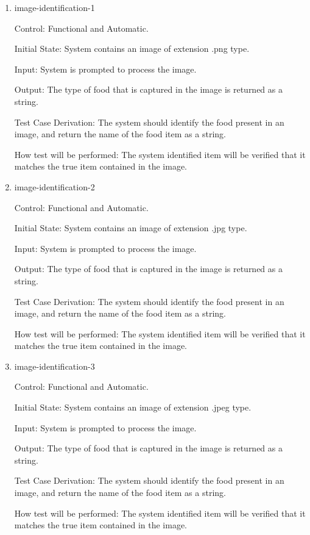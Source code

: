 \documentclass[12pt, titlepage]{article}
\begin{document}
	\begin{enumerate}
		
		\item{image-identification-1\\}
		
		Control: Functional and Automatic.
		
		Initial State: System contains an image of extension .png type.
		
		Input: System is prompted to process the image.
		
		Output: The type of food that is captured in the image is returned as a 
		string.
		
		Test Case Derivation: The system should identify the food present in an 
		image, and return the name of the food item as a string.
		
		How test will be performed: The system identified item will be verified 
		that it matches the true item contained in the image.
		
		\item{image-identification-2\\}
		
		Control: Functional and Automatic.
		
		Initial State: System contains an image of extension .jpg type.
		
		Input: System is prompted to process the image.
		
		Output: The type of food that is captured in the image is returned as a 
		string.
		
		Test Case Derivation: The system should identify the food present in an 
		image, and return the name of the food item as a string.
		
		How test will be performed: The system identified item will be verified 
		that it matches the true item contained in the image.
		
		\item{image-identification-3\\}
		
		Control: Functional and Automatic.
		
		Initial State: System contains an image of extension .jpeg type.
		
		Input: System is prompted to process the image.
		
		Output: The type of food that is captured in the image is returned as a 
		string.
		
		Test Case Derivation: The system should identify the food present in an 
		image, and return the name of the food item as a string.
		
		How test will be performed: The system identified item will be verified 
		that it matches the true item contained in the image.
		
	\end{enumerate}
	
\end{document}
